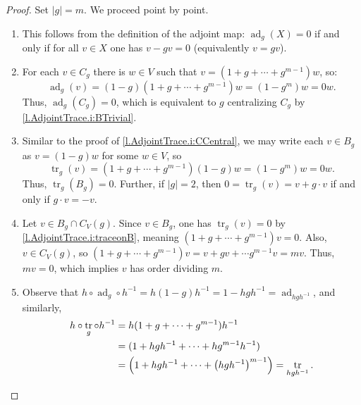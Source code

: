 \documentclass[a4paper, 11pt]{amsart}
\theoremstyle{plain}
\theoremstyle{definition}
\theoremstyle{remark}
\DeclareMathOperator{\ad}{ad}
\DeclareMathOperator{\tr}{tr}
\begin{document}
\begin{proof}
Set $|g|=m$. We proceed point by point. 
\begin{enumerate}
\item[\eqref{l.AdjointTrace.i:BTrivial}] This follows  from the definition of the adjoint map: $\ad_g(X) = 0$ if and only if for all $v\in X$ one has $v-gv=0$ (equivalently $v= gv$).

\item[\eqref{l.AdjointTrace.i:CCentral}] For each $v\in C_{g}$ there is $w\in V$ such that $v=\left(1+g+\cdots+g^{m-1}\right) w$, so:
\[ \ad_g(v) 
= \left(1-g\right)\left(1+g+\cdots+g^{m-1}\right) w
=\left(1-g^m\right) w
=0  w.\]
Thus, $\ad_g(C_g) = 0$, which is equivalent to $g$ centralizing $C_g$ by  \eqref{l.AdjointTrace.i:BTrivial}.

\item[\eqref{l.AdjointTrace.i:traceonB}] Similar to the proof of \eqref{l.AdjointTrace.i:CCentral}, we may write each $v\in B_{g}$ as $v=\left(1-g\right) w$
for some $w\in V$, so
\[ \tr_g(v) 
= \left(1+g+\cdots+g^{m-1}\right)\left(1-g\right) w
=\left(1-g^m\right) w
=0  w.\]
Thus,  $\tr_g(B_g) = 0$. Further, if $|g| = 2$, then $0 = \tr_g(v) = v+g\cdot v$ if and only if $g\cdot v = -v$.

\item[\eqref{l.AdjointTrace.i:BCIntersection}] Let $v \in B_g \cap C_V(g)$. Since $v \in B_g$, one has $\tr_g(v) = 0$ by \eqref{l.AdjointTrace.i:traceonB}, meaning $(1 + g + \cdots + g^{m-1})v = 0$. Also, $v\in C_V(g)$, so $(1 + g + \cdots + g^{m-1})v = v + gv + \cdots g^{m-1}v = mv$. Thus, $mv = 0$, which implies $v$ has order dividing $m$. 

\item[\eqref{l.AdjointTrace.i:AdTrConjugation}] Observe that  $h\circ\ad_g\circ h^{-1} = h(1-g)h^{-1} = 1-hgh^{-1} =\ad_{hgh^{-1}}$, and similarly, 
\begin{align*}
 h\circ\tr_g\circ h^{-1} 
    & =h(1+g+\cdots+g^{m-1})h^{-1}\\
    & =(1+hgh^{-1}+\cdots+hg^{m-1}h^{-1})\\
    & =\left(1+hgh^{-1}+\cdots+\left(hgh^{-1}\right)^{m-1}\right)=\tr_{hgh^{-1}}.\qedhere
 \end{align*}
\end{enumerate}
\end{proof}
\end{document}
